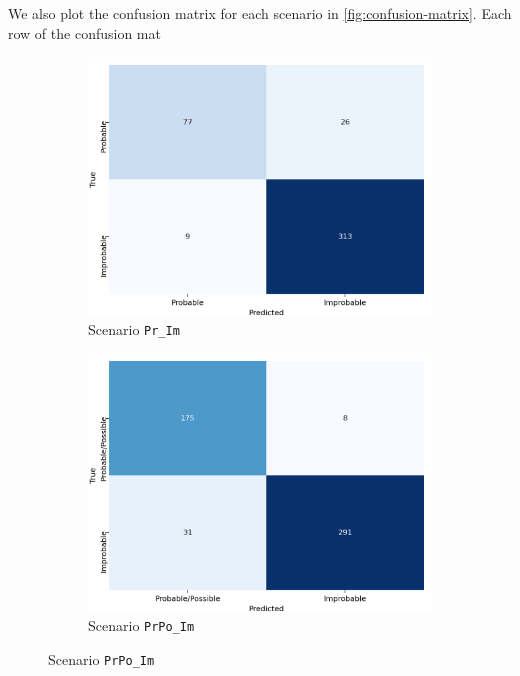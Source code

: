 \documentclass[Journal,letterpaper, SingleSpace, InsideFigs]{ascelike-new}
\begin{document}
We also plot the confusion matrix for each scenario in \autoref{fig:confusion-matrix}.
Each row of the confusion mat
\begin{figure}[ht]
  \centering
  \begin{subfigure}[t]{.25\linewidth}
    \centering
    \includegraphics[width=\linewidth]{opt-confusion-matrix-Pr_Im-128-px.png}
    \caption{Scenario \texttt{Pr\_Im}}
    \label{pr_im_cm}
  \end{subfigure}%
   \begin{subfigure}[t]{.25\linewidth}
    \centering
    \includegraphics[width=\linewidth]{opt-confusion-matrix-PrPo_Im-128-px.png}
    \caption{Scenario \texttt{PrPo\_Im}}
    \label{prpo_im_cm}
  \end{subfigure}%

\end{figure}
\end{document}
